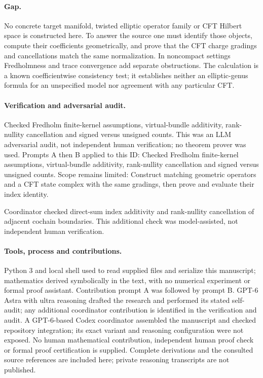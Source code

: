 \documentclass[11pt]{article}
\begin{document}
\paragraph{Gap.}No concrete target manifold, twisted elliptic operator family or CFT Hilbert space is constructed here. To answer the source one must identify those objects, compute their coefficients geometrically, and prove that the CFT charge gradings and cancellations match the same normalization. In noncompact settings Fredholmness and trace convergence add separate obstructions. The calculation is a known coefficientwise consistency test; it establishes neither an elliptic-genus formula for an unspecified model nor agreement with any particular CFT.

\paragraph{Verification and adversarial audit.}
Checked Fredholm finite-kernel assumptions, virtual-bundle additivity, rank-nullity cancellation and signed versus unsigned counts. This was an LLM adversarial audit, not independent human verification; no theorem prover was used. Prompts A then B applied to this ID: Checked Fredholm finite-kernel assumptions, virtual-bundle additivity, rank-nullity cancellation and signed versus unsigned counts. Scope remains limited: Construct matching geometric operators and a CFT state complex with the same gradings, then prove and evaluate their index identity.

Coordinator checked direct-sum index additivity and rank-nullity cancellation of adjacent cochain boundaries. This additional check was model-assisted, not independent human verification.

\paragraph{Tools, process and contributions.}
Python 3 and local shell used to read supplied files and serialize this manuscript; mathematics derived symbolically in the text, with no numerical experiment or formal proof assistant. Contribution prompt A was followed by prompt B. GPT-6 Astra with ultra reasoning drafted the research and performed its stated self-audit; any additional coordinator contribution is identified in the verification and audit. A GPT-6-based Codex coordinator assembled the manuscript and checked repository integration; its exact variant and reasoning configuration were not exposed. No human mathematical contribution, independent human proof check or formal proof certification is supplied. Complete derivations and the consulted source references are included here; private reasoning transcripts are not published.
\end{document}
